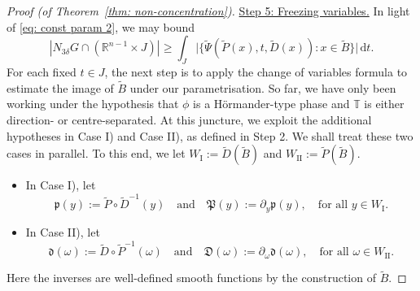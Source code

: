 \documentclass[reqno]{amsart}
\numberwithin{equation}{section}
\newcommand{\R}{\mathbb{R}}
\newcommand{\T}{\mathbb{T}}
\newcommand{\ud}{\mathrm{d}}
\newcommand{\fd}{\mathfrak{d}}
\newcommand{\fD}{\mathfrak{D}}
\newcommand{\fp}{\mathfrak{p}}
\newcommand{\fP}{\mathfrak{P}}
\theoremstyle{plain}
\theoremstyle{definition}
\newcommand{\tI}{\mathrm{I}}
\newcommand{\tII}{\mathrm{II}}
\begin{document}
\begin{proof}[Proof (of Theorem~\ref{thm: non-concentration})]


\noindent \underline{Step 5: Freezing variables.} In light of \eqref{eq: const param 2}, we may bound
\begin{equation*}
        |N_{3\delta} G \cap (\R^{n-1} \times J)| \geq \int_J \big|\big\{\widetilde{\Psi}(\widetilde{P}(x),t,\widetilde{D}(x)): x \in \widetilde{B}\big\}\big|\,\ud t.
\end{equation*}
For each fixed $t \in J$, the next step is to apply the change of variables formula to estimate the image of $\widetilde{B}$ under our parametrisation. So far, we have only been working under the hypothesis that $\phi$ is a H\"ormander-type phase and $\T$ is either direction- or centre-separated. At this juncture, we exploit the additional hypotheses in Case I) and Case II), as defined in Step 2. We shall treat these two cases in parallel. To this end, we let $W_{\tI} := \widetilde{D}(\widetilde{B})$ and $W_{\tII} := \widetilde{P}(\widetilde{B})$.

\begin{itemize}
    \item In Case I), let
    \begin{equation*}
  \fp(y) := \widetilde{P}\circ\widetilde{D}^{-1}(y) \quad \textrm{and} \quad \fP(y) := \partial_y \fp(y),\quad \text{for all $y\in W_{\tI}$.}
\end{equation*}
    \item In Case II), let
  \begin{equation*}
  \fd(\omega) := \widetilde{D} \circ \widetilde{P}^{-1}(\omega) \quad \textrm{and} \quad \fD(\omega) := \partial_{\omega} \fd(\omega),\quad \text{for all $\omega \in W_{\tII}$.}
\end{equation*}
\end{itemize}
Here the inverses are well-defined smooth functions by the construction of $\widetilde{B}$.


\end{proof}
\end{document}
